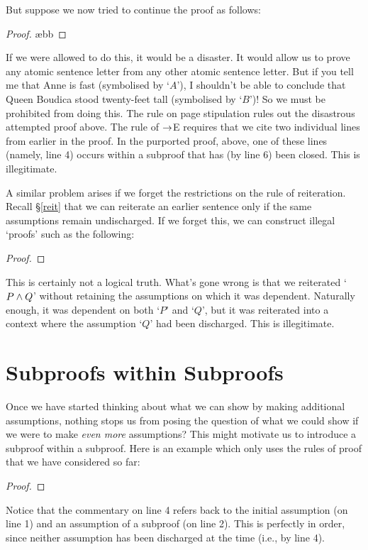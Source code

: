 But suppose we now tried to continue the proof as follows:
\begin{proof}
	\open
		 \ae{bb}
	\close
\end{proof}
If we were allowed to do this, it would be a disaster. It would allow us to prove any atomic sentence letter from any other atomic sentence letter. But if you tell me that Anne is fast (symbolised by `$A$'), I shouldn't be able to conclude that Queen Boudica stood twenty-feet tall (symbolised by `$B$')! So we must be prohibited from doing this. The rule on page \pageref{subproof.rule} stipulation rules out the disastrous attempted proof above. The rule of $\rightarrow$E requires that we cite two individual lines from earlier in the proof. In the purported proof, above, one of these lines (namely, line 4) occurs within a subproof that has (by line 6) been closed. This is illegitimate. 

A similar problem arises if we forget the restrictions on the rule of reiteration. Recall §\ref{reit} that we can reiterate an earlier sentence only if the same assumptions remain undischarged. If we forget this, we can construct illegal `proofs' such as the following:
\begin{proof}
	\open
	\open
	 
	\close
	 
	 
	\close
\end{proof} This is certainly not a logical truth. What's gone wrong is that we reiterated `$P\wedge Q$' without retaining the assumptions on which it was dependent. Naturally enough, it was dependent on both `$P$' and `$Q$', but it was reiterated into a context where the assumption `$Q$' had been discharged. This is illegitimate.

\section{Subproofs within Subproofs}

Once we have started thinking about what we can show by making additional assumptions, nothing stops us from posing the question of what we could show if we were to make \emph{even more} assumptions? This might motivate us to introduce a subproof within a subproof. Here is an example which only uses the rules of proof that we have considered so far:
\begin{proof}
\open
	\open
	\close
\close
{}
\end{proof}
Notice that the commentary on line 4 refers back to the initial assumption (on line 1) and an assumption of a subproof (on line 2). This is perfectly in order, since neither assumption has been discharged at the time (i.e., by line 4).

